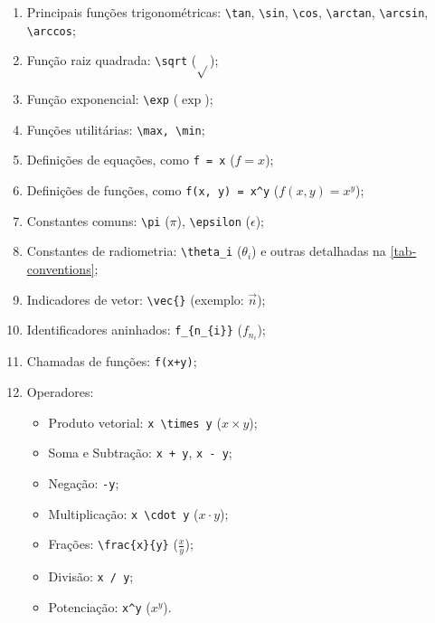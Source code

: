 \begin{enumerate}
\item Principais funções trigonométricas: \verb"\tan", \verb"\sin", \verb"\cos", \verb"\arctan", \verb"\arcsin", \verb"\arccos";
\item Função raiz quadrada: \verb"\sqrt" ($\sqrt{}$);
\item Função exponencial: \verb"\exp" ($\exp{}$);
\item Funções utilitárias: \verb"\max, \min";
\item Definições de equações, como \verb"f = x" ($f = x$);
\item Definições de funções, como \verb"f(x, y) = x^y" ($f(x, y) = x^y$);
\item Constantes comuns: \verb"\pi" ($\pi$), \verb"\epsilon" ($\epsilon$);
\item Constantes de radiometria: \verb"\theta_i" ($\theta_i$) e outras detalhadas na \autoref{tab-conventions};
\item Indicadores de vetor: \verb"\vec{}" (exemplo: $\vec{n}$);
\item Identificadores aninhados: \verb"f_{n_{i}}" ($f_{n_{i}}$);
\item Chamadas de funções: \verb"f(x+y)";
\item Operadores:
\begin{itemize}
\item Produto vetorial: \verb"x \times y" ($x \times y$);
\item Soma e Subtração: \verb"x + y", \verb"x - y";
\item Negação: \verb"-y";
\item Multiplicação: \verb"x \cdot y" ($x \cdot y$);
\item Frações: \verb"\frac{x}{y}" ($\frac{x}{y}$);
\item Divisão: \verb"x / y";
\item Potenciação: \verb"x^y" ($x^y$).
\end{itemize}
\end{enumerate}

